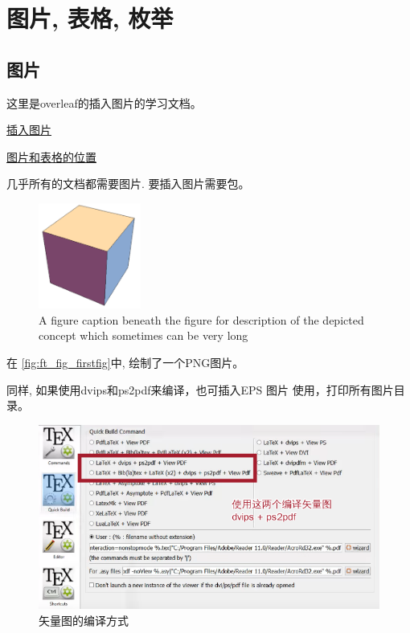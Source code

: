 
\chapter{图片, 表格, 枚举}


\section{图片}

这里是overleaf的插入图片的学习文档。

\href{https://www.overleaf.com/learn/latex/Inserting_Images}{插入图片}

\href{https://www.overleaf.com/learn/latex/Positioning_images_and_tables}{图片和表格的位置}

几乎所有的文档都需要图片. 要插入图片需要包。

\begin{figure}[!h]
	\centering
	\includegraphics[width=0.3\textwidth]{figures/cube.png}
	\caption{A figure caption beneath the figure for description of the depicted concept which sometimes can be very long}
	\label{fig:ft_fig_firstfig}
\end{figure}

在 \autoref{fig:ft_fig_firstfig}中, 绘制了一个PNG图片。 

同样, 如果使用dvips和ps2pdf来编译，也可插入EPS 图片
使用，打印所有图片目录。

\begin{figure}[!h]
    \centering
    \includegraphics[width=0.8\linewidth]{figures/vector_figure.png}
    \caption{矢量图的编译方式}%
    \label{fig:vector_figure}
\end{figure}

